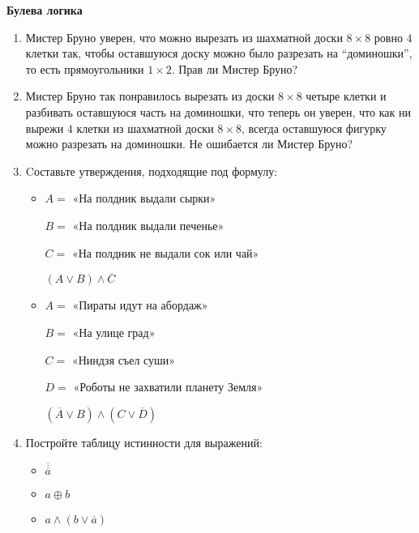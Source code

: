 \documentclass{article}
\begin{document}
\large
	
	
\begin{center}
	\textbf{Булева логика}
\end{center}

\begin{enumerate}[label*=\protect\fbox{\arabic{enumi}}]
	
	\item Мистер Бруно уверен, что можно вырезать из шахматной доски $8 \times 8$ ровно $4$ клетки так, чтобы оставшуюся доску можно было разрезать на “доминошки”, то есть прямоугольники $1 \times 2$. Прав ли Мистер Бруно?
	
	\item Мистер Бруно так понравилось вырезать из доски $8 \times 8$ четыре клетки и разбивать оставшуюся часть на доминошки, что теперь он уверен, что как ни вырежи $4$ клетки из шахматной доски $8 \times 8$, всегда оставшуюся фигурку можно разрезать на доминошки. Не ошибается ли Мистер Бруно?
	
	\item Cоставьте утверждения, подходящие под формулу:
	\begin{itemize}
		\item 
		$A =$ «На полдник выдали сырки»
		
		$B =$ «На полдник выдали печенье»
		
		$C =$ «На полдник не выдали сок или чай» 
		
		$(A\vee B)\wedge \overline{C}$
		
		\item 
		$A =$ «Пираты идут на абордаж»
		
		$B =$ «На улице град»
		
		$C =$ «Ниндзя съел суши»
		
		$D =$ «Роботы не захватили планету Земля» 
		
		$(\overline{A}\vee B)\wedge (C \vee \overline{D})$
		
	\end{itemize}
	
	\item Постройте таблицу истинности для выражений:
	\begin{itemize}
		
		\item $\overline{\overline{\overline{a}}}$
		
		\item $a \oplus b$
		
		\item $a \wedge (b \vee \overline{a})$
		

\end{itemize}
\end{enumerate}
\end{document}
